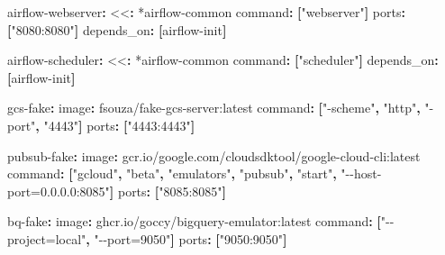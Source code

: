 \documentclass[
  11pt,
  british,
  oneside]{book}
\newenvironment{Shaded}{\begin{snugshade}}{\end{snugshade}}
\newcommand{\AttributeTok}[1]{\textcolor[rgb]{0.77,0.63,0.00}{#1}}
\newcommand{\FunctionTok}[1]{\textcolor[rgb]{0.00,0.00,0.00}{#1}}
\newcommand{\KeywordTok}[1]{\textcolor[rgb]{0.13,0.29,0.53}{\textbf{#1}}}
\newcommand{\OtherTok}[1]{\textcolor[rgb]{0.56,0.35,0.01}{#1}}
\newcommand{\StringTok}[1]{\textcolor[rgb]{0.31,0.60,0.02}{#1}}
\begin{document}
\begin{Shaded}
\begin{Highlighting}[]
\AttributeTok{  }\FunctionTok{airflow{-}webserver}\KeywordTok{:}
\AttributeTok{    }\FunctionTok{\textless{}\textless{}}\KeywordTok{:}\AttributeTok{ }\OtherTok{*airflow{-}common}
\AttributeTok{    }\FunctionTok{command}\KeywordTok{:}\AttributeTok{ }\KeywordTok{[}\StringTok{"webserver"}\KeywordTok{]}
\AttributeTok{    }\FunctionTok{ports}\KeywordTok{:}\AttributeTok{ }\KeywordTok{[}\StringTok{"8080:8080"}\KeywordTok{]}
\AttributeTok{    }\FunctionTok{depends\_on}\KeywordTok{:}\AttributeTok{ }\KeywordTok{[}\AttributeTok{airflow{-}init}\KeywordTok{]}

\AttributeTok{  }\FunctionTok{airflow{-}scheduler}\KeywordTok{:}
\AttributeTok{    }\FunctionTok{\textless{}\textless{}}\KeywordTok{:}\AttributeTok{ }\OtherTok{*airflow{-}common}
\AttributeTok{    }\FunctionTok{command}\KeywordTok{:}\AttributeTok{ }\KeywordTok{[}\StringTok{"scheduler"}\KeywordTok{]}
\AttributeTok{    }\FunctionTok{depends\_on}\KeywordTok{:}\AttributeTok{ }\KeywordTok{[}\AttributeTok{airflow{-}init}\KeywordTok{]}

\AttributeTok{  }\FunctionTok{gcs{-}fake}\KeywordTok{:}
\AttributeTok{    }\FunctionTok{image}\KeywordTok{:}\AttributeTok{ fsouza/fake{-}gcs{-}server:latest}
\AttributeTok{    }\FunctionTok{command}\KeywordTok{:}\AttributeTok{ }\KeywordTok{[}\StringTok{"{-}scheme"}\KeywordTok{,}\AttributeTok{ }\StringTok{"http"}\KeywordTok{,}\AttributeTok{ }\StringTok{"{-}port"}\KeywordTok{,}\AttributeTok{ }\StringTok{"4443"}\KeywordTok{]}
\AttributeTok{    }\FunctionTok{ports}\KeywordTok{:}\AttributeTok{ }\KeywordTok{[}\StringTok{"4443:4443"}\KeywordTok{]}

\AttributeTok{  }\FunctionTok{pubsub{-}fake}\KeywordTok{:}
\AttributeTok{    }\FunctionTok{image}\KeywordTok{:}\AttributeTok{ gcr.io/google.com/cloudsdktool/google{-}cloud{-}cli:latest}
\AttributeTok{    }\FunctionTok{command}\KeywordTok{:}\AttributeTok{ }\KeywordTok{[}\StringTok{"gcloud"}\KeywordTok{,}\AttributeTok{ }\StringTok{"beta"}\KeywordTok{,}\AttributeTok{ }\StringTok{"emulators"}\KeywordTok{,}\AttributeTok{ }\StringTok{"pubsub"}\KeywordTok{,}\AttributeTok{ }\StringTok{"start"}\KeywordTok{,}\AttributeTok{ }\StringTok{"{-}{-}host{-}port=0.0.0.0:8085"}\KeywordTok{]}
\AttributeTok{    }\FunctionTok{ports}\KeywordTok{:}\AttributeTok{ }\KeywordTok{[}\StringTok{"8085:8085"}\KeywordTok{]}

\AttributeTok{  }\FunctionTok{bq{-}fake}\KeywordTok{:}
\AttributeTok{    }\FunctionTok{image}\KeywordTok{:}\AttributeTok{ ghcr.io/goccy/bigquery{-}emulator:latest}
\AttributeTok{    }\FunctionTok{command}\KeywordTok{:}\AttributeTok{ }\KeywordTok{[}\StringTok{"{-}{-}project=local"}\KeywordTok{,}\AttributeTok{ }\StringTok{"{-}{-}port=9050"}\KeywordTok{]}
\AttributeTok{    }\FunctionTok{ports}\KeywordTok{:}\AttributeTok{ }\KeywordTok{[}\StringTok{"9050:9050"}\KeywordTok{]}
\end{Highlighting}
\end{Shaded}
\end{document}
